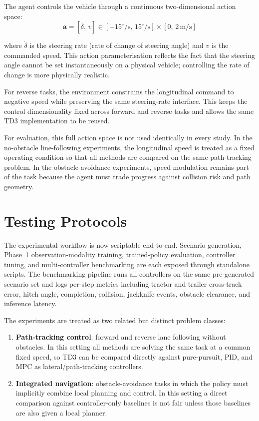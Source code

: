 The agent controls the vehicle through a continuous two-dimensional action space:
\begin{equation}
    \mathbf{a} = [\dot{\delta},\, v] \in [-15^\circ/\text{s},\, 15^\circ/\text{s}] \times [0,\, 2\,\text{m/s}]
    \label{eq:action_space}
\end{equation}

where $\dot{\delta}$ is the steering rate (rate of change of steering angle) and $v$ is the commanded speed. This action parameterisation reflects the fact that the steering angle cannot be set instantaneously on a physical vehicle; controlling the rate of change is more physically realistic.

For reverse tasks, the environment constrains the longitudinal command to negative speed while preserving the same steering-rate interface. This keeps the control dimensionality fixed across forward and reverse tasks and allows the same TD3 implementation to be reused.

For evaluation, this full action space is not used identically in every study. In the no-obstacle line-following experiments, the longitudinal speed is treated as a fixed operating condition so that all methods are compared on the same path-tracking problem. In the obstacle-avoidance experiments, speed modulation remains part of the task because the agent must trade progress against collision risk and path geometry.

\section{Testing Protocols}

The experimental workflow is now scriptable end-to-end. Scenario generation, Phase~1 observation-modality training, trained-policy evaluation, controller tuning, and multi-controller benchmarking are each exposed through standalone scripts. The benchmarking pipeline runs all controllers on the same pre-generated scenario set and logs per-step metrics including tractor and trailer cross-track error, hitch angle, completion, collision, jackknife events, obstacle clearance, and inference latency.

The experiments are treated as two related but distinct problem classes:
\begin{enumerate}
    \item \textbf{Path-tracking control}: forward and reverse lane following without obstacles. In this setting all methods are solving the same task at a common fixed speed, so TD3 can be compared directly against pure-pursuit, PID, and MPC as lateral/path-tracking controllers.
    \item \textbf{Integrated navigation}: obstacle-avoidance tasks in which the policy must implicitly combine local planning and control. In this setting a direct comparison against controller-only baselines is not fair unless those baselines are also given a local planner.
\end{enumerate}

